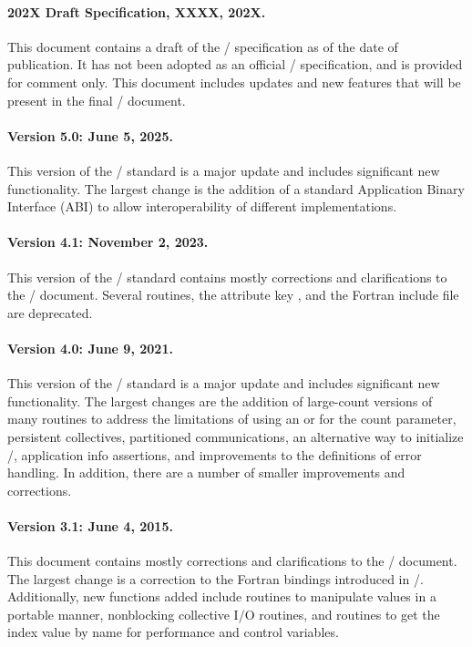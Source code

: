 
\ifdraftspec
\paragraph*{202X Draft Specification, XXXX, 202X.}
This document contains a draft of the \MPI/ specification as of the date of
publication.
It has not been adopted as an official \MPI/ specification, and
is provided for comment only.
This document includes updates and new features that will be present in the
final \mpivdoti/ document.
\else
\fi

\paragraph*{Version 5.0: June 5, 2025.}
This version of the \MPIV/ standard is a major update and includes
significant new functionality.
The largest change is the addition of a standard Application
Binary Interface (ABI) to allow interoperability of different
implementations.

\paragraph*{Version 4.1: November 2, 2023.}
This version of the \MPIIVDOTI/ standard contains mostly corrections
and clarifications to the \MPIIVDOTO/ document. Several routines, the
attribute key , and the  Fortran
include file are deprecated.

\paragraph*{Version 4.0: June 9, 2021.}
This version of the \MPIIV/ standard is a major update and includes
significant new functionality.
The largest changes are the addition of large-count versions of many
routines to address the limitations of using an 
or  for the count parameter, persistent collectives, partitioned
communications, an alternative way to initialize \MPI/, application
info assertions, and improvements to the definitions of error handling.
In addition, there are a number of smaller improvements and corrections.

\paragraph*{Version 3.1:  June 4, 2015.}
This document contains mostly corrections and clarifications to the
\mpiiiidoto/ document.  The largest change is a correction to the Fortran
bindings introduced in \mpiiiidoto/.
Additionally, new functions added
include routines to manipulate  values in a portable manner, nonblocking
collective I/O routines, and routines to get the index value by name for
 performance and control variables.

